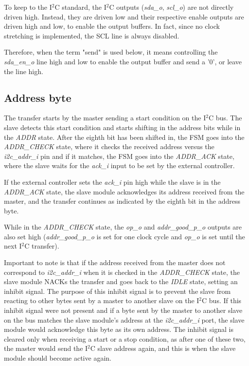 \documentclass[a4paper,11pt]{article}
\begin{document}
To keep to the I$^2$C standard, the I$^2$C outputs (\textit{sda\_o}, \textit{scl\_o}) are
not directly driven high. Instead, they are driven low and their respective enable outputs
are driven high and low, to enable the output buffers. In fact, since no clock stretching
is implemented, the SCL line is always disabled.

Therefore, when the term "send" is used below, it means controlling the \textit{sda\_en\_o}
line high and low to enable the output buffer and send a '0', or leave the line high.

\subsection{Address byte}

The transfer starts by the master sending a start condition on the I$^2$C bus.
The slave detects this start condition and starts shifting in the address bits while in the
\textit{ADDR} state. After the eighth bit has been shifted in, the FSM goes into the
\textit{ADDR\_CHECK} state, where it checks the received address versus the
\textit{i2c\_addr\_i} pin and if it matches, the FSM goes into the \textit{ADDR\_ACK} state,
where the slave waits for the \textit{ack\_i} input to be set by the external controller.

If the external controller sets the \textit{ack\_i} pin high while the slave is
in the \textit{ADDR\_ACK} state, the slave module acknowledges its address received
from the master, and the transfer continues as indicated by the eighth bit in the
address byte.

While in the \textit{ADDR\_CHECK} state, the \textit{op\_o} and \textit{addr\_good\_p\_o}
outputs are also set high (\textit{addr\_good\_p\_o} is set for one clock cycle and
\textit{op\_o} is set until the next I$^2$C transfer).

Important to note is that if the address received from the master does not correspond
to \textit{i2c\_addr\_i} when it is checked in the \textit{ADDR\_CHECK} state, the
slave module NACKs the transfer and goes back to the \textit{IDLE} state, setting an inhibit
signal. The purpose of this inhibit signal is to prevent the slave from reacting to
other bytes sent by a master to another slave on the I$^2$C bus. If this inhibit
signal were not present and if a byte sent by the master to another slave on the bus
matches the slave module's address at the \textit{i2c\_addr\_i} port, the slave module
would acknowledge this byte as its own address. The inhibit signal is cleared only when
receiving a start or a stop condition, as after one of these two, the master would
send the I$^2$C slave address again, and this is when the slave module should become
active again.
\end{document}
